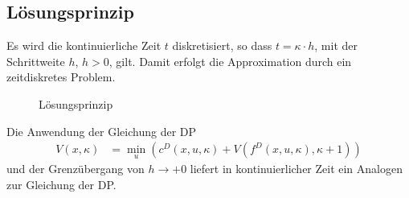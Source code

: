 \subsection{Lösungsprinzip}
Es wird die kontinuierliche Zeit $t$ diskretisiert, so dass $t=\kappa\cdot h$, mit der Schrittweite $h$, $h>0$, gilt. Damit erfolgt die Approximation durch ein zeitdiskretes Problem. 
\begin{figure}[htb]
	\centering
	
	\caption{Lösungsprinzip}
	\label{fig:kap_3_loesungsprinzip}
\end{figure}
Die Anwendung der Gleichung der \ac{DP} 
\begin{align}
	V(x,\kappa) & = \min\limits_{u}\left(c^D(x, u, \kappa) + V\left(f^D(x, u ,\kappa),\kappa+1 \right) \right)
\end{align}
und der Grenzübergang von $h\rightarrow +0$ liefert in kontinuierlicher Zeit ein Analogen zur Gleichung der \ac{DP}.

